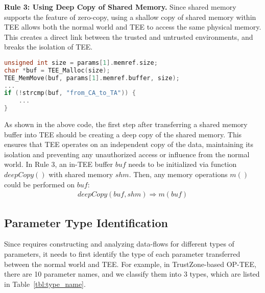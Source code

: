 \textbf{Rule 3: Using Deep Copy of Shared Memory.} Since shared memory supports the feature of zero-copy, using a shallow copy of shared memory within TEE allows both the normal world and TEE to access the same physical memory. This creates a direct link between the trusted and untrusted environments, and breaks the isolation of TEE. 
\begin{lstlisting}[language=c++, aboveskip=10pt, belowskip=5pt]
unsigned int size = params[1].memref.size;
char *buf = TEE_Malloc(size);
TEE_MemMove(buf, params[1].memref.buffer, size);
...
if (!strcmp(buf, "from_CA_to_TA")) {
    ...
}
\end{lstlisting}

As shown in the above code, the first step after transferring a shared memory buffer into TEE should be creating a deep copy of the shared memory. This ensures that TEE operates on an independent copy of the data, maintaining its isolation and preventing any unauthorized access or influence from the normal world.
In Rule 3, an in-TEE buffer $buf$ needs to be initialized via function $deepCopy()$ with shared memory $shm$. Then, any memory operations $m()$ could be performed on $buf$:
\begin{equation}
\begin{aligned}
deepCopy(buf,shm) \Rightarrow m(buf)
\end{aligned}
\end{equation}

\subsection{Parameter Type Identification}
Since \ccSysName requires constructing and analyzing data-flows for different types of parameters, it needs to first identify the type of each parameter transferred between the normal world and TEE.
For example, in TrustZone-based OP-TEE, there are 10 parameter names, and we classify them into 3 types, which are listed in Table~\ref{tbl:type_name}.

